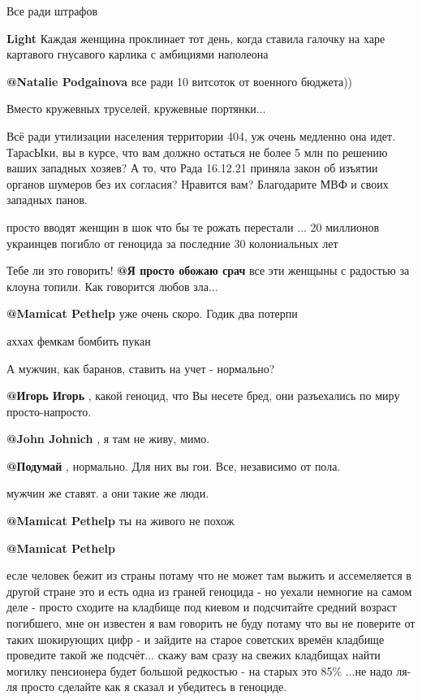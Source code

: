 \begin{itemize} %
Все ради штрафов

\textbf{Light} Каждая женщина проклинает тот день, когда ставила галочку на харе картавого гнусавого карлика с амбициями наполеона

 \textbf{@Natalie Podgainova}  все ради 10 витсоток от военного бюджета))

Вместо кружевных труселей, кружевные портянки...


Всё ради утилизации населения территории 404, уж очень медленно она идет.
ТарасЫки, вы в курсе, что вам должно остаться не более 5 млн по решению ваших
западных хозяев? А то, что Рада 16.12.21 приняла закон об изъятии органов
шумеров без их согласия?  Нравится вам? Благодарите МВФ и своих западных панов. 


просто вводят женщин в шок что бы те рожать перестали ... 20 миллионов украинцев погибло от геноцида за последние 30 колониальных лет

Тебе ли это говорить!
 \textbf{@Я просто обожаю срач}  все эти женщыны с радостью за клоуна топили. Как говорится любов зла...

 \textbf{@Mamicat Pethelp}  уже очень скоро. Годик два потерпи

аххах фемкам бомбить пукан 

А мужчин, как баранов, ставить на учет - нормально?

\textbf{@Игорь Игорь}  , какой геноцид, что Вы несете бред, они разъехались по миру просто-напросто.

\textbf{@John Johnich}  , я там не живу, мимо.

\textbf{@Подумай}  , нормально. Для них вы гои. Все, независимо от пола.

мужчин же ставят. а они такие же люди.

\textbf{@Mamicat Pethelp}  ты на живого не похож 

\textbf{@Mamicat Pethelp}  

есле человек бежит из страны потаму что не может там выжить и ассемеляется в
другой стране это и есть одна из граней геноцида - но уехали немногие на
самом деле - просто сходите на кладбище под киевом и  подсчитайте средний
возраст погибшего, мне он известен я вам говорить не буду потаму что вы не
поверите от таких шокирующих цифр - и зайдите на старое советских времён
кладбище проведите такой же подсчёт... скажу вам сразу на свежих кладбищах
найти могилку пенсионера будет большой редкостью  - на старых это 85\% ...не
надо ля-ля просто сделайте как я сказал и убедитесь в геноциде.


\end{itemize}
